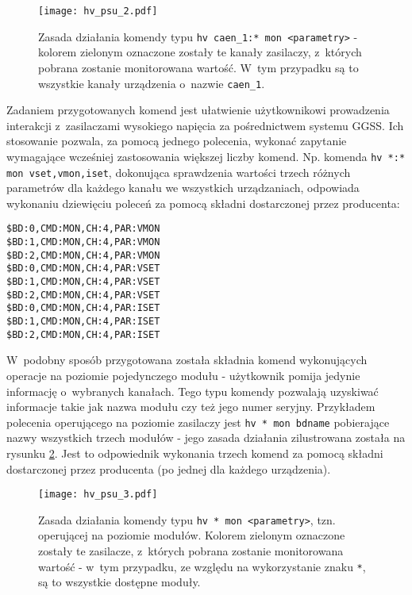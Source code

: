 \begin{figure}[H]
\centering
\texttt{[image: hv\_psu\_2.pdf]}
\caption{Zasada działania komendy typu \lstinline{hv caen_1:* mon <parametry>} - kolorem zielonym oznaczone zostały te kanały zasilaczy, z~których pobrana zostanie monitorowana wartość. W~tym przypadku są to wszystkie kanały urządzenia o~nazwie \lstinline{caen_1}.}
\label{fig:psu2}
\end{figure}

Zadaniem przygotowanych komend jest ułatwienie użytkownikowi prowadzenia interakcji z~zasilaczami wysokiego napięcia za pośrednictwem systemu GGSS. Ich stosowanie pozwala, za pomocą jednego polecenia, wykonać zapytanie wymagające wcześniej zastosowania większej liczby komend. Np. komenda \lstinline{hv *:* mon vset,vmon,iset}, dokonująca sprawdzenia wartości trzech różnych parametrów dla każdego kanału we wszystkich urządzaniach, odpowiada wykonaniu dziewięciu poleceń za pomocą składni dostarczonej przez producenta:
\begin{lstlisting}
$BD:0,CMD:MON,CH:4,PAR:VMON
$BD:1,CMD:MON,CH:4,PAR:VMON
$BD:2,CMD:MON,CH:4,PAR:VMON
$BD:0,CMD:MON,CH:4,PAR:VSET
$BD:1,CMD:MON,CH:4,PAR:VSET
$BD:2,CMD:MON,CH:4,PAR:VSET
$BD:0,CMD:MON,CH:4,PAR:ISET
$BD:1,CMD:MON,CH:4,PAR:ISET
$BD:2,CMD:MON,CH:4,PAR:ISET
\end{lstlisting}

W~podobny sposób przygotowana została składnia komend wykonujących operacje na poziomie pojedynczego modułu - użytkownik pomija jedynie informację o~wybranych kanałach. Tego typu komendy pozwalają uzyskiwać informacje takie jak nazwa modułu czy też jego numer seryjny. Przykładem polecenia operującego na poziomie zasilaczy jest \lstinline{hv * mon bdname} pobierające nazwy wszystkich trzech modułów - jego zasada działania zilustrowana została na rysunku \ref{fig:psu3}. Jest to odpowiednik wykonania trzech komend za pomocą składni dostarczonej przez producenta (po jednej dla każdego urządzenia).

\begin{figure}[H]
\centering
\texttt{[image: hv\_psu\_3.pdf]}
\caption{Zasada działania komendy typu \lstinline{hv * mon <parametry>}, tzn. operującej na poziomie modułów. Kolorem zielonym oznaczone zostały te zasilacze, z~których pobrana zostanie monitorowana wartość - w~tym przypadku, ze względu na wykorzystanie znaku \lstinline{*}, są to wszystkie dostępne moduły.}
\label{fig:psu3}
\end{figure}

